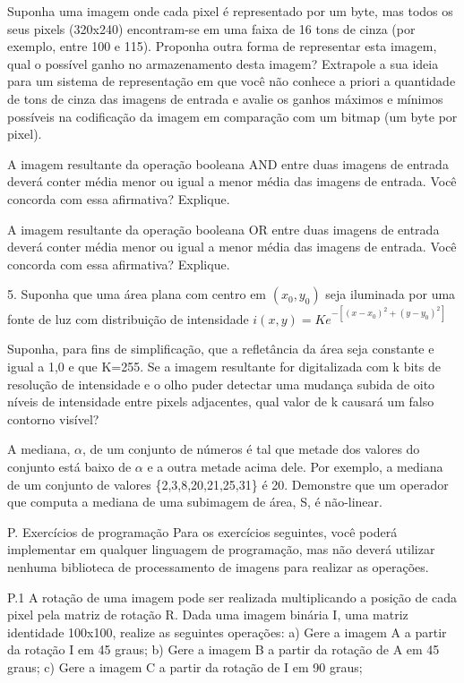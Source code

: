 \documentclass[12pt,a4paper]{article}
\begin{document}
Suponha uma imagem onde cada pixel é representado por um byte, mas todos os seus pixels (320x240) encontram-se em uma faixa de 16 tons de cinza (por exemplo, entre 100 e 115). Proponha outra forma de representar esta imagem, qual o possível ganho no armazenamento desta imagem? Extrapole a sua ideia para um sistema de representação em que você não conhece a priori a quantidade de tons de cinza das imagens de entrada e avalie os ganhos máximos e mínimos possíveis na codificação da imagem em comparação com um bitmap (um byte por pixel).

A imagem resultante da operação booleana AND entre duas imagens de entrada deverá conter média menor ou igual a menor média das imagens de entrada. Você concorda com essa afirmativa? Explique.

A imagem resultante da operação booleana OR entre duas imagens de entrada deverá conter média menor ou igual a menor média das imagens de entrada. Você concorda com essa afirmativa? Explique.


5. Suponha que uma área plana com centro em $({x_0},{y_0})$ seja iluminada por
uma fonte de luz com distribuição de intensidade 
$i(x,y) = Ke^{-[(x-{x_0})^{2}+(y-{y_0})^{2}]}$

Suponha, para fins de simplificação, que a refletância da área seja constante e
igual a 1,0 e que K=255. Se a imagem resultante for digitalizada com k bits de
resolução de intensidade e o olho puder detectar uma mudança subida de oito
níveis de intensidade entre pixels adjacentes, qual valor de k causará um falso
contorno visível?


A mediana, $\alpha$, de um conjunto de números é tal que metade dos valores do
conjunto está baixo de $\alpha$ e a outra metade acima dele. Por exemplo, a
mediana de um conjunto de valores \{2,3,8,20,21,25,31\} é 20. Demonstre que um
operador que computa a mediana de uma subimagem de área, S, é não-linear.



P. Exercícios de programação
Para os exercícios seguintes, você poderá implementar em qualquer linguagem de programação, mas não deverá utilizar nenhuma biblioteca de processamento de imagens para realizar as operações.

P.1 A rotação de uma imagem pode ser realizada multiplicando a posição de cada pixel pela matriz de rotação R. Dada uma imagem binária I, uma matriz identidade 100x100, realize as seguintes operações:
    a) Gere a imagem A a partir da rotação I em 45 graus;
    b) Gere a imagem B a partir da rotação de A em 45 graus;
    c) Gere a imagem C a partir da rotação de I em 90 graus;
\end{document}
